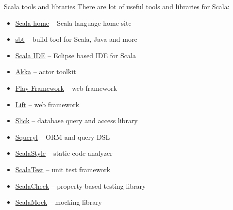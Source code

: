 \documentclass{beamer}
\begin{document}
\begin{frame}{Scala tools and libraries}
There are lot of useful tools and libraries for Scala:
\begin{itemize}
\item \href{http://www.scala-lang.org}{Scala home} -- Scala language home site
\item \href{http://www.scala-sbt.org}{sbt} -- build tool for Scala, Java and more
\item \href{http://www.scala-ide.org}{Scala IDE} -- Eclipse based IDE for Scala
\item \href{http://www.akka.io}{Akka} -- actor toolkit
\item \href{http://www.playframework.com}{Play Framework} -- web framework
\item \href{http://www.liftweb.net}{Lift} -- web framework
\item \href{http://slick.typesafe.com}{Slick} -- database query and access library
\item \href{http://squeryl.org}{Squeryl} -- ORM and query DSL
\item \href{http://www.scalastyle.org/}{ScalaStyle} -- static code analyzer
\item \href{http://www.scalatest.org}{ScalaTest} -- unit test framework
\item \href{http://www.scalacheck.org}{ScalaCheck} -- property-based testing library
\item \href{http://www.scalamock.org}{ScalaMock} -- mocking library
\end{itemize}
\end{frame}


\end{document}
